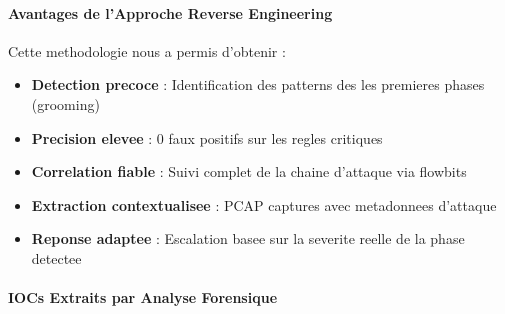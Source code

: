 \paragraph{Avantages de l'Approche Reverse Engineering}

Cette methodologie nous a permis d'obtenir :

\begin{itemize}
    \item \textbf{Detection precoce} : Identification des patterns des les premieres phases (grooming)
    \item \textbf{Precision elevee} : 0 faux positifs sur les regles critiques
    \item \textbf{Correlation fiable} : Suivi complet de la chaine d{'}attaque via flowbits
    \item \textbf{Extraction contextualisee} : PCAP captures avec metadonnees d{'}attaque
    \item \textbf{Reponse adaptee} : Escalation basee sur la severite reelle de la phase detectee
\end{itemize}

\paragraph{IOCs Extraits par Analyse Forensique}

